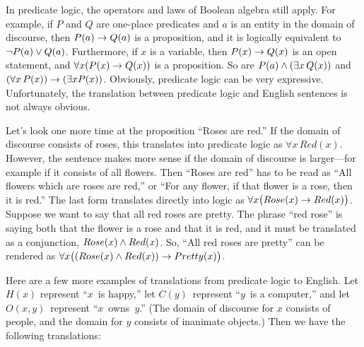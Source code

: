 \medbreak

In predicate logic, the operators and laws of Boolean algebra still
apply.  For example, if $P$ and $Q$ are one-place predicates and
$a$ is an entity in the domain of discourse, then $P(a)\rightarrow Q(a)$
is a proposition, and it is logically equivalent to $\lnot P(a)\vee Q(a)$.
Furthermore, if $x$ is a variable, then $P(x)\rightarrow Q(x)$ is an open
statement, and $\forall x(P(x)\rightarrow Q(x))$ is a proposition.
So are $P(a)\wedge(\exists x\,Q(x))$ and $(\forall x\,P(x))\rightarrow(\exists xP(x))$.
Obviously, predicate logic can be very expressive.  Unfortunately,
the translation between predicate logic and English sentences is not
always obvious.

Let's look one more time at the proposition ``Roses are red.''
If the domain of discourse consists of roses, this translates into
predicate logic as $\forall x\, Red(x)$.  However, the sentence makes
more sense if the domain of discourse is larger---for example if it
consists of all flowers.  Then ``Roses are red'' has to be read as
``All flowers which are roses are red,'' or ``For any flower,
if that flower is a rose, then it is red.'' The last form translates
directly into logic as $\forall x\big(Rose(x)\rightarrow Red(x)\big)$.
Suppose we want to say that all red roses are pretty.  The phrase
``red rose'' is saying both that the flower is a rose and that it is
red, and it must be translated as a conjunction, $Rose(x)\wedge Red(x)$.
So, ``All red roses are pretty'' can be rendered as
$\forall x\big((Rose(x)\wedge Red(x))\rightarrow Pretty(x)\big)$.

Here are a few more examples of translations from predicate logic
to English.  Let $H(x)$ represent ``$x$~is happy,'' let
$C(y)$~represent ``$y$~is a computer,'' and let $O(x,y)$~represent
``$x$~owns~$y$.''  (The domain of discourse for $x$ consists of 
people, and the domain for $y$ consists of inanimate objects.)
Then we have the following translations:

